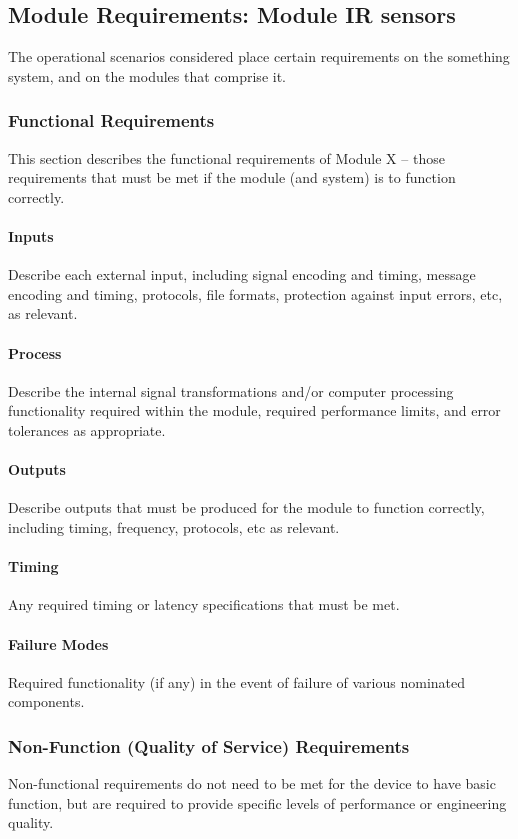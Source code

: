 \documentclass[MTRX3700report.tex]{subfiles}
\begin{document}
\subsection{Module Requirements: Module IR sensors}
The operational scenarios considered place certain requirements on the something system, and on the modules that comprise it.
\subsubsection{Functional Requirements}
This section describes the functional requirements of Module X – those requirements that must be met if the module (and system) is to function correctly.  

\paragraph{Inputs}
Describe each external input, including signal encoding and timing, message encoding and timing, protocols, file formats, protection against input errors, etc, as relevant.
\paragraph{Process}
Describe the internal signal transformations and/or computer processing functionality required within the module, required performance limits, and error tolerances as appropriate.
\paragraph{Outputs}
Describe outputs that must be produced for the module to function correctly, including timing, frequency, protocols, etc as relevant.
\paragraph{Timing}
Any required timing or latency specifications that must be met.
\paragraph{Failure Modes}
Required functionality (if any) in the event of failure of various nominated components.

\subsubsection{Non-Function (Quality of Service) Requirements}
Non-functional requirements do not need to be met for the device to have basic function, but are required to provide specific levels of performance or engineering quality.
\end{document}
